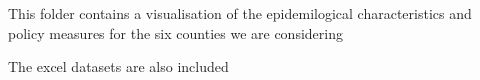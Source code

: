 This folder contains a visualisation of the epidemilogical characteristics and policy measures for the six counties we are considering 


The excel datasets are also included 
